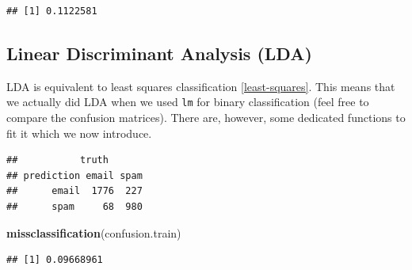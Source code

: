 \documentclass[]{book}
\newenvironment{Shaded}{\begin{snugshade}}{\end{snugshade}}
\newcommand{\KeywordTok}[1]{\textcolor[rgb]{0.13,0.29,0.53}{\textbf{#1}}}
\newcommand{\DataTypeTok}[1]{\textcolor[rgb]{0.13,0.29,0.53}{#1}}
\newcommand{\DecValTok}[1]{\textcolor[rgb]{0.00,0.00,0.81}{#1}}
\newcommand{\StringTok}[1]{\textcolor[rgb]{0.31,0.60,0.02}{#1}}
\newcommand{\CommentTok}[1]{\textcolor[rgb]{0.56,0.35,0.01}{\textit{#1}}}
\newcommand{\OperatorTok}[1]{\textcolor[rgb]{0.81,0.36,0.00}{\textbf{#1}}}
\newcommand{\NormalTok}[1]{#1}
\theoremstyle{definition}
\theoremstyle{definition}
\theoremstyle{definition}
\theoremstyle{remark}
\begin{document}
\begin{verbatim}
## [1] 0.1122581
\end{verbatim}

\subsection{Linear Discriminant Analysis
(LDA)}\label{linear-discriminant-analysis-lda}

LDA is equivalent to least squares classification \ref{least-squares}.
This means that we actually did LDA when we used \texttt{lm} for binary
classification (feel free to compare the confusion matrices). There are,
however, some dedicated functions to fit it which we now introduce.

\begin{Shaded}
\end{Shaded}

\begin{verbatim}
##           truth
## prediction email spam
##      email  1776  227
##      spam     68  980
\end{verbatim}

\begin{Shaded}
\begin{Highlighting}[]
\KeywordTok{missclassification}\NormalTok{(confusion.train)}
\end{Highlighting}
\end{Shaded}

\begin{verbatim}
## [1] 0.09668961
\end{verbatim}

\begin{Shaded}
\end{Shaded}
\end{document}

